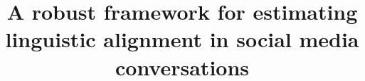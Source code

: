 \documentclass{acm_proc_article-sp}
\begin{document}
\title{A robust framework for estimating linguistic alignment in social media conversations}
%
%
%
%
%
\end{document}
